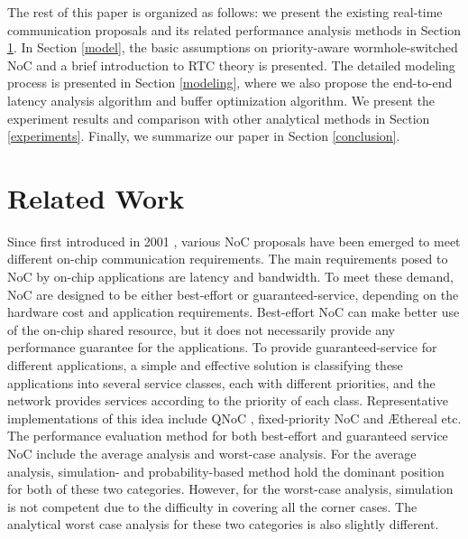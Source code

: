 \documentclass[10pt,journal]{IEEEtran}
\begin{document}
The rest of this paper is organized as follows: we present the existing real-time communication proposals and its related performance analysis methods in Section \ref{related}. In Section \ref{model}, the basic assumptions on priority-aware wormhole-switched NoC and a brief introduction to RTC theory is presented. The detailed modeling process is presented in Section \ref{modeling}, where we also propose the end-to-end latency analysis algorithm and buffer optimization algorithm. We present the experiment results and comparison with other analytical methods in Section \ref{experiments}. Finally, we summarize our paper in Section \ref{conclusion}.

\section{Related Work}\label{related}
Since first introduced in 2001 \cite{DaTo01}, various NoC proposals have been emerged to meet different on-chip communication requirements. The main requirements posed to NoC by on-chip applications are latency and bandwidth. To meet these demand, NoC are designed to be either best-effort or guaranteed-service, depending on the hardware cost and application requirements. Best-effort NoC can make better use of the on-chip shared resource, but it does not necessarily provide any performance guarantee for the applications. To provide guaranteed-service for different applications, a simple and effective solution is classifying these applications into several service classes, each with different priorities, and the network provides services according to the priority of each class. Representative implementations of this idea include QNoC \cite{BCGK04}, fixed-priority NoC \cite{Shi:2008:RCA:1397757.1397996} and {{\AE}thereal} \cite{GoDR05} etc. The performance evaluation method for both best-effort and guaranteed service NoC include the average analysis and worst-case analysis. For the average analysis, simulation- and probability-based method hold the dominant position for both of these two categories. However, for the worst-case analysis, simulation is not competent due to the difficulty in covering all the corner cases. The analytical worst case analysis for these two categories is also slightly different. 
\end{document}
